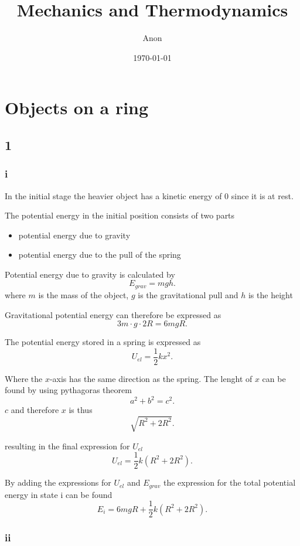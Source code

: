 \documentclass[12pt,a4paper]{article}
\title{Mechanics and Thermodynamics}
\author{Anon}
\date{\today}
\begin{document}
\maketitle
\section{Objects on a ring}

\subsection{1}

\subsubsection{i}

In the initial stage the heavier object has a kinetic energy of 0 since it is at rest.

The potential energy in the initial position consists of two parts

\begin{itemize}
	\item potential energy due to gravity
	\item potential energy due to the pull of the spring
\end{itemize}


Potential energy due to gravity is calculated by \[
	E_{grav}=mgh
.\] 
where $m$ is the mass of the object,  $g$ is the gravitational pull and $h$ is the height

Gravitational potential energy can therefore be expressed as \[
3m\cdot g\cdot 2R = 6mgR
.\] 

The potential energy stored in a spring is expressed as \[
U_{el} = \frac{1}{2}kx^2
.\] 

Where the $x$-axis has the same direction as the spring. The lenght of  $x$ can be found by using pythagoras theorem \[
a^{2}+b^{2}=c^{2}
.\] 
$c$ and therefore $x$ is thus \[
\sqrt{R^{2}+2R^{2}} 
.\] 

resulting in the final expression for $U_{el}$ \[
	U_{el}=\frac{1}{2}k\left( R^2+2R^2 \right)
.\] 

By adding the expressions for $U_{el}$ and $E_{grav}$ the expression for the total potential energy in state i can be found \[
	E_{i}=6mgR+\frac{1}{2}k\left( R^{2}+2R^{2} \right) 
.\] 

\subsubsection{ii}
\end{document}
